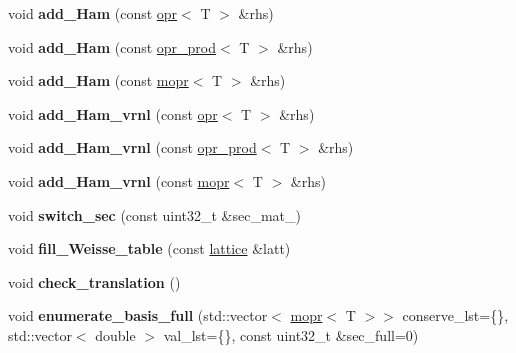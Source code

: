 \begin{DoxyCompactItemize}
void {\bfseries add\+\_\+\+Ham} (const \hyperlink{classqbasis_1_1opr}{opr}$<$ T $>$ \&rhs)
\item 
\mbox{\label{classqbasis_1_1model_a888f09f452029268426793f982f9bd3f}} 
void {\bfseries add\+\_\+\+Ham} (const \hyperlink{classqbasis_1_1opr__prod}{opr\+\_\+prod}$<$ T $>$ \&rhs)
\item 
\mbox{\label{classqbasis_1_1model_a305c589da9612e18b281f718a757de03}} 
void {\bfseries add\+\_\+\+Ham} (const \hyperlink{classqbasis_1_1mopr}{mopr}$<$ T $>$ \&rhs)
\item 
\mbox{\label{classqbasis_1_1model_a685ec9e4a36c31fefbd8eca4775a7548}} 
void {\bfseries add\+\_\+\+Ham\+\_\+vrnl} (const \hyperlink{classqbasis_1_1opr}{opr}$<$ T $>$ \&rhs)
\item 
\mbox{\label{classqbasis_1_1model_a8c6552624964aeb2c30d60816835ad6b}} 
void {\bfseries add\+\_\+\+Ham\+\_\+vrnl} (const \hyperlink{classqbasis_1_1opr__prod}{opr\+\_\+prod}$<$ T $>$ \&rhs)
\item 
\mbox{\label{classqbasis_1_1model_a505120ad11af7e835bf31e1df23cbf71}} 
void {\bfseries add\+\_\+\+Ham\+\_\+vrnl} (const \hyperlink{classqbasis_1_1mopr}{mopr}$<$ T $>$ \&rhs)
\item 
\mbox{\label{classqbasis_1_1model_a94bcaded6aa4a2c1e4f86f29387e6043}} 
void {\bfseries switch\+\_\+sec} (const uint32\+\_\+t \&sec\+\_\+mat\+\_\+)
\item 
\mbox{\label{classqbasis_1_1model_a2108e0ee1b28731c66abf5118b0b6dd0}} 
void {\bfseries fill\+\_\+\+Weisse\+\_\+table} (const \hyperlink{classqbasis_1_1lattice}{lattice} \&latt)
\item 
\mbox{\label{classqbasis_1_1model_a88ce83e484785f05551c23e21b083b5a}} 
void {\bfseries check\+\_\+translation} ()
\item 
\mbox{\label{classqbasis_1_1model_a194ef85ad0622cb9518d70c8e7f2e43d}} 
void {\bfseries enumerate\+\_\+basis\+\_\+full} (std\+::vector$<$ \hyperlink{classqbasis_1_1mopr}{mopr}$<$ T $>$$>$ conserve\+\_\+lst=\{\}, std\+::vector$<$ double $>$ val\+\_\+lst=\{\}, const uint32\+\_\+t \&sec\+\_\+full=0)
$$
\end{DoxyCompactItemize}
